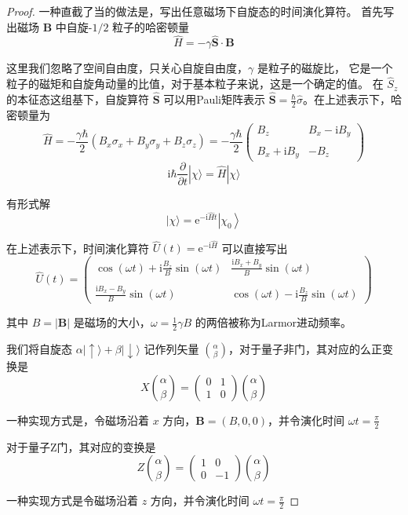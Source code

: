 \begin{proof}
    一种直截了当的做法是，写出任意磁场下自旋态的时间演化算符。
    首先写出磁场 $\mathbf{B}$ 中自旋-$1/2$ 粒子的哈密顿量
$$\hat{H}=-\gamma \hat{\mathbf{S}} \cdot \mathbf{B}$$

这里我们忽略了空间自由度，只关心自旋自由度，$\gamma$ 是粒子的磁旋比，
它是一个粒子的磁矩和自旋角动量的比值，对于基本粒子来说，这是一个确定的值。
在 $\hat{S}_{z}$ 的本征态这组基下，自旋算符 $\hat{\mathbf{S}}$ 
可以用Pauli矩阵表示 $\hat{\mathbf{S}}=\frac{\hbar}{2} \hat{\sigma}$。在上述表示下，哈密顿量为
$$\hat{H}=-\frac{\gamma \hbar}{2}(B_{x} \sigma_{x}+B_{y} \sigma_{y}+B_{z} \sigma_{z})
=-\frac{\gamma \hbar}{2}\begin{pmatrix}
B_{z} & B_{x}-\mathrm{i} B_{y} \\ \\
B_{x}+\mathrm{i} B_{y} & -B_{z}
\end{pmatrix}$$
$$\mathrm{i} \hbar \frac{\partial}{\partial t}|\chi\rangle
=\hat{H}|\chi\rangle$$

有形式解
$$|\chi\rangle=\mathrm{e}^{-\mathrm{i} \hat{H} t}\left|\chi_{0}\right\rangle$$

在上述表示下，时间演化算符 $\hat{U}(t)=\mathrm{e}^{-\mathrm{i} \hat{H}}$ 可以直接写出
$$\hat{U}(t)=\begin{pmatrix}
\cos (\omega t)+\mathrm{i} \frac{B_{z}}{B} \sin (\omega t) & \frac{\mathrm{i} B_{x}+B_{y}}{B} \sin (\omega t) \\ \\
\frac{\mathrm{i} B_{x}-B_{y}}{B} \sin (\omega t) & \cos (\omega t)-\mathrm{i} \frac{B_{z}}{B} \sin (\omega t)
\end{pmatrix}$$

其中 $B=|\mathbf{B}|$ 是磁场的大小，$\omega=\frac{1}{2} \gamma B$ 的两倍被称为Larmor进动频率。

我们将自旋态 $\alpha|\uparrow\rangle+\beta|\downarrow\rangle$ 记作列矢量 $\binom{\alpha}{\beta}$，对于量子非门，其对应的么正变换是
$$X\binom{\alpha}{\beta}=\begin{pmatrix}
0 & 1 \\
1 & 0
\end{pmatrix}\binom{\alpha}{\beta}$$

一种实现方式是，令磁场沿着 $x$ 方向，$\mathbf{B}=(B,0,0)$，并令演化时间 $\omega t=\frac{\pi}{2}$

对于量子Z门，其对应的变换是
$$Z\binom{\alpha}{\beta}=\begin{pmatrix}
1 & 0 \\
0 & -1
\end{pmatrix}\binom{\alpha}{\beta}$$

一种实现方式是令磁场沿着 $z$ 方向，并令演化时间 $\omega t=\frac{\pi}{2}$
\end{proof}
